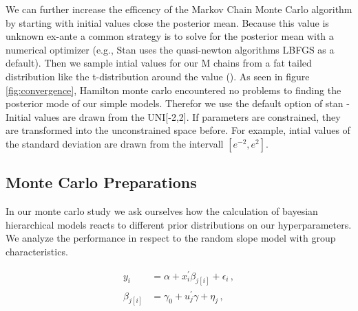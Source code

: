 
We can further increase the efficency of the Markov Chain Monte Carlo algorithm by starting with initial values close the posterior mean. Because this value is unknown ex-ante a common strategy is to solve for the posterior mean with a numerical optimizer (e.g., Stan uses the quasi-newton algorithms LBFGS as a default). Then we sample intial values for our M chains from a fat tailed distribution like the t-distribution around the value (\cite{brooks1998}).
As seen in figure \ref{fig:convergence}, Hamilton monte carlo encountered no problems to finding the posterior mode of our simple models. Therefor we use the default option of stan - Initial values are drawn from the UNI[-2,2]. If parameters are constrained, they are transformed into the unconstrained space before. For example, intial values of the standard deviation are drawn from the intervall $[e^{-2},e^2]$.   




\subsection{Monte Carlo Preparations}
In our monte carlo study we ask ourselves how the calculation of bayesian hierarchical models reacts to different prior distributions on our hyperparameters.
We analyze the performance in respect to the random slope model with group characteristics.

\begin{align}
  y_i &= \alpha+ x_i^\prime \beta_{j[i]} + \epsilon_i \,,\\
  \beta_{j[i]} &= \gamma_0 + u_j^\prime \gamma + \eta_j \,,
\end{align}

